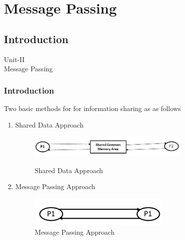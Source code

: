 \documentclass{beamer}
\begin{document}
\section{Message Passing}

\subsection{Introduction}
\begin{frame}
	\centering
	\large Unit-II\\
	\huge Message Passing
\end{frame}


\begin{frame}
	\frametitle{Introduction}
		Two basic methods for for information sharing as as follows
		\begin{enumerate}
		\item Shared Data Approach\\
		\begin{figure}
			\centering
			\includegraphics[width=8cm]{sharedDataApproach.jpg}\\
			\caption{Shared Data Approach}
		\end{figure}
		\item Message Passing Approach\\
		\begin{figure}
			\centering
			\includegraphics[width=7cm]{messagePassingApproach.jpg}
			\caption{Message Passing Approach}
		\end{figure}
		\end{enumerate}
\end{frame}
\end{document}
